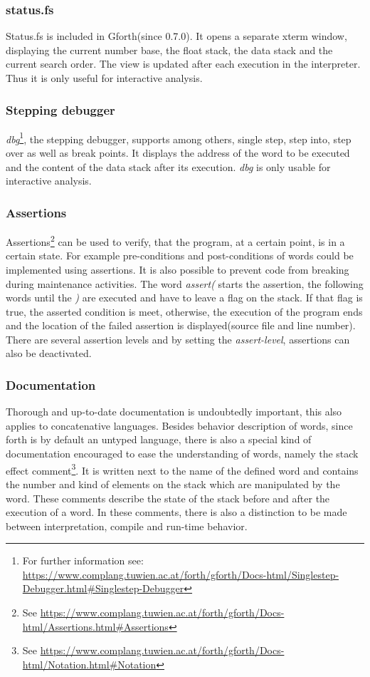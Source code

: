\subsubsection*{status.fs}
Status.fs is included in Gforth(since 0.7.0). It opens a separate xterm window, displaying the current number base, the float stack, the data stack and the current search order. The view is updated after each execution in the interpreter. Thus it is only useful for interactive analysis.

\subsubsection*{Stepping debugger}
\emph{dbg}\footnote{For further information see: \url{https://www.complang.tuwien.ac.at/forth/gforth/Docs-html/Singlestep-Debugger.html\#Singlestep-Debugger}}, the stepping debugger, supports among others, single step, step into, step over as well as break points. It displays the address of the word to be executed and the content of the data stack after its execution. \emph{dbg} is only usable for interactive analysis.

\subsubsection*{Assertions}
Assertions\footnote{See \url{https://www.complang.tuwien.ac.at/forth/gforth/Docs-html/Assertions.html\#Assertions}} can be used to verify, that the program, at a certain point, is in a certain state. For example pre-conditions and post-conditions of words could be implemented using assertions. It is also possible to prevent code from breaking during maintenance activities. The word \emph{assert(} starts the assertion, the following words until the \emph{)} are executed and have to leave a flag on the stack. If that flag is true, the asserted condition is meet, otherwise, the execution of the program ends and the location of the failed assertion is displayed(source file and line number).\\
There are several assertion levels and by setting the \emph{assert-level}, assertions can also be deactivated.

\subsubsection*{Documentation}
Thorough and up-to-date documentation is undoubtedly important, this also applies to concatenative languages. Besides behavior description of words, since forth is by default an untyped language, there is also a special kind of documentation encouraged to ease the understanding of words, namely the stack effect comment\footnote{See \url{https://www.complang.tuwien.ac.at/forth/gforth/Docs-html/Notation.html\#Notation}}. It is written next to the name of the defined word and contains the number and kind of elements on the stack which are manipulated by the word. These comments describe the state of the stack before and after the execution of a word. In these comments, there is also a distinction to be made between interpretation, compile and run-time behavior.


